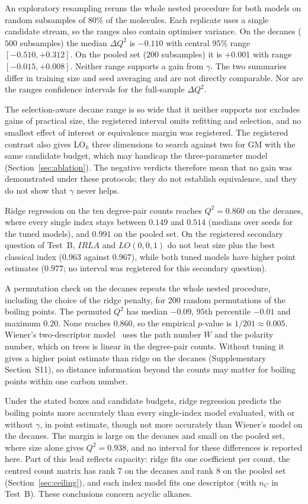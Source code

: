 \documentclass[a5paper, 10pt]{article}
\theoremstyle{plain}
\theoremstyle{remark}
\theoremstyle{definition}
\begin{document}
An exploratory resampling reruns the whole nested
procedure for both models on random subsamples of $80\%$ of the
molecules. Each replicate uses a single candidate stream, so the ranges
also contain optimiser variance. On the decanes ($500$ subsamples) the median $\Delta Q^2$ is
$-0.110$ with central $95\%$ range $[-0.510, +0.312]$. On the pooled set
($200$ subsamples) it is $+0.001$ with range $[-0.015, +0.008]$.
Neither range supports a gain from $\gamma$. The two summaries differ in
training size and seed averaging and are not directly comparable. Nor are the ranges confidence intervals for the full-sample $\Delta Q^2$.

The selection-aware decane
range is so wide that it neither supports nor excludes gains of
practical size, the registered interval omits refitting and selection,
and no smallest effect of interest or equivalence margin was
registered. The registered contrast also gives LO$_h$ three dimensions
to search against two for GM with the same candidate budget, which
may handicap the three-parameter model (Section~\ref{sec:ablation}). The
negative verdicts therefore mean that no gain was demonstrated under
these protocols; they do not establish equivalence, and they do not
show that $\gamma$ never helps.

Ridge
regression on the ten degree-pair counts reaches $Q^2 = 0.860$ on the
decanes, where every single index stays between $0.149$ and $0.514$
(medians over seeds for the tuned models), and
$0.991$ on the pooled set. On the registered secondary question of
Test~B, $IRLA$ and $LO(0,0,1)$ do not beat size plus the best classical
index ($0.963$ against $0.967$), while both tuned models have higher point estimates ($0.977$; no interval was registered for this secondary question).

A permutation check on the decanes repeats
the whole nested procedure, including the choice of the ridge penalty,
for $200$ random permutations of the boiling points. The permuted $Q^2$
has median $-0.09$, $95$th percentile $-0.01$ and maximum $0.20$. None reaches $0.860$, so the empirical $p$-value is $1/201 \approx 0.005$.
Wiener's two-descriptor model~\cite{Wiener1947} uses the path number $W$ and the polarity number, which on trees is linear in the degree-pair counts. Without tuning it gives a higher point estimate than ridge on the decanes (Supplementary Section~S11), so distance information beyond the counts may matter for boiling points within one carbon number.

Under the stated boxes and candidate budgets, ridge regression predicts the boiling points more accurately than every single-index
model evaluated, with or without $\gamma$, in point estimate, though not more accurately than Wiener's model on the decanes. The margin is large on the decanes and small on the pooled set, where size alone gives $Q^2 = 0.938$, and no interval for these differences is reported here. Part of this lead
reflects capacity: ridge fits one coefficient per count, the centred count
matrix has rank $7$ on the decanes and rank $8$ on the pooled set
(Section~\ref{sec:ceiling}), and each index model fits one descriptor
(with $n_C$ in Test~B). These conclusions concern acyclic alkanes.
\end{document}
